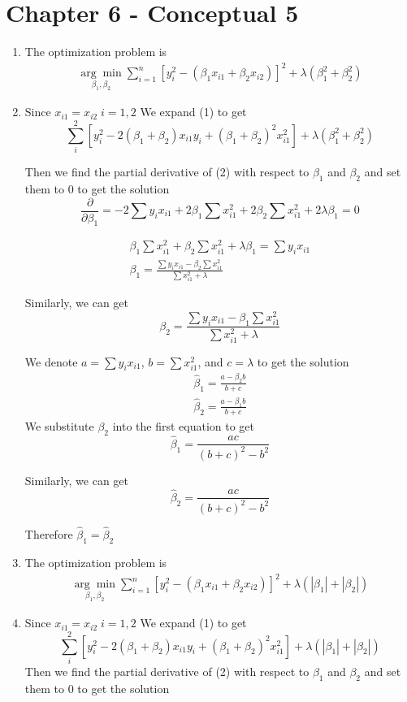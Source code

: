 \documentclass{article}
\begin{document}
\section{Chapter 6 - Conceptual 5}
\begin{enumerate}[label=(\alph*)]
\item The optimization problem is 
\begin{align}
    \underset{\beta_1, \beta_2}{\arg\min} \sum_{i=1}^{n} \left[ y_i^2 - (\beta_1 x_{i1} + \beta_2 x_{i2})\right]^2 + \lambda(\beta_1^2 + \beta_2 ^2)
\end{align}
\item Since \(x_{i1} = x_{i2}\; i = 1,2\) We expand (1) to get 
\[
\sum_{i}^{2} \left[ y_i^2 - 2(\beta_1 + \beta_2) x_{i1}y_i + (\beta_1 + \beta_2)^2x_{i1}^2 \right] + \lambda(\beta_1^2 + \beta_2 ^2)
\]

Then we find the partial derivative of (2) with respect to \(\beta_1\) and \(\beta_2\) and set them to 0 to get the solution
\[
\frac{\partial}{\partial \beta_1} = -2 \sum y_i x_{i1} + 2\beta_1 \sum x_{i1}^2 + 2 \beta_2 \sum x_{i1}^2 +  2\lambda \beta_1 = 0
\]

\begin{align*}
    \beta_1 \sum x_{i1}^2 + \beta_2 \sum x_{i1}^2 + \lambda \beta_1 = \sum y_i x_{i1} \\
    \beta_1 = \frac{\sum y_i x_{i1} - \beta_2 \sum x_{i1}^2}{\sum x_{i1}^2 + \lambda}
\end{align*}

Similarly, we can get
\[
    \beta_2 = \frac{\sum y_i x_{i1} - \beta_1 \sum x_{i1}^2}{\sum x_{i1}^2 + \lambda}
\]

We denote \(a = \sum y_i x_{i1}\), \(b = \sum x_{i1}^2\), and \(c = \lambda\) to get the solution
\begin{align*}
    \hat \beta_1 = \frac{a - \beta_2 b}{b + c} \\
    \hat \beta_2 = \frac{a - \beta_1 b}{b + c}
\end{align*}
We substitute \(\beta_2\) into the first equation to get
\[
    \hat \beta_1 = \frac{ac}{(b + c)^2 - b^2}
\]

Similarly, we can get
\[
    \hat \beta_2 = \frac{ac}{(b + c)^2 - b^2}
\]

Therefore \(\hat \beta_1 = \hat \beta_2\) 

\item The optimization problem is 
\begin{align}
    \underset{\beta_1, \beta_2}{\arg\min} \sum_{i=1}^{n} \left[ y_i^2 - (\beta_1 x_{i1} + \beta_2 x_{i2})\right]^2 + \lambda(|\beta_1| + |\beta_2|)
\end{align}
\item Since \(x_{i1} = x_{i2}\; i = 1,2\) We expand (1) to get 
\[
\sum_{i}^{2} \left[ y_i^2 - 2(\beta_1 + \beta_2) x_{i1}y_i + (\beta_1 + \beta_2)^2x_{i1}^2 \right] + \lambda(|\beta_1| + |\beta_2|)
\]
Then we find the partial derivative of (2) with respect to \(\beta_1\) and \(\beta_2\) and set them to 0 to get the solution


\end{enumerate}
\end{document}
